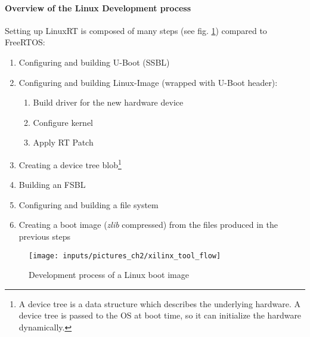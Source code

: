 \paragraph{Overview of the Linux Development process}
Setting up LinuxRT is composed of many steps (see fig. \ref{fig_xilinx_tool_flow}) compared to FreeRTOS:
\begin{enumerate}
	\item Configuring and building U-Boot (\ac{SSBL})
	\item Configuring and building Linux-Image (wrapped with U-Boot header):
		\begin{enumerate}
			\item Build driver for the new hardware device
			\item Configure kernel
			\item Apply RT Patch
		\end{enumerate}
	\item Creating a device tree blob\footnote{A device tree is a data structure which describes the underlying hardware. A device tree is passed to the \ac{OS} at boot time, so it can initialize the hardware dynamically.\cite{device_tree}}
	\item Building an \ac{FSBL}
	\item Configuring and building a file system
	\item Creating a boot image (\textit{zlib} compressed) from the files produced in the previous steps 
\end{enumerate}

\begin{figure}[htb]
		\begin{center}
			\texttt{[image: inputs/pictures\_ch2/xilinx\_tool\_flow]}
			\caption[Development process of a Linux boot image]{Development process of a Linux boot image \cite{xilinx:gt}} \label{fig_xilinx_tool_flow}
		\end{center}
\end{figure} 

